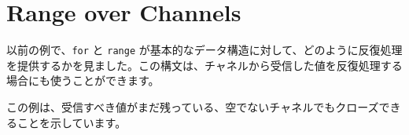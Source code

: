 \section{Range over Channels}

以前の例で、\texttt{for} と \texttt{range} が基本的なデータ構造に対して、どのように反復処理を提供するかを見ました。この構文は、チャネルから受信した値を反復処理する場合にも使うことができます。




この例は、受信すべき値がまだ残っている、空でないチャネルでもクローズできることを示しています。